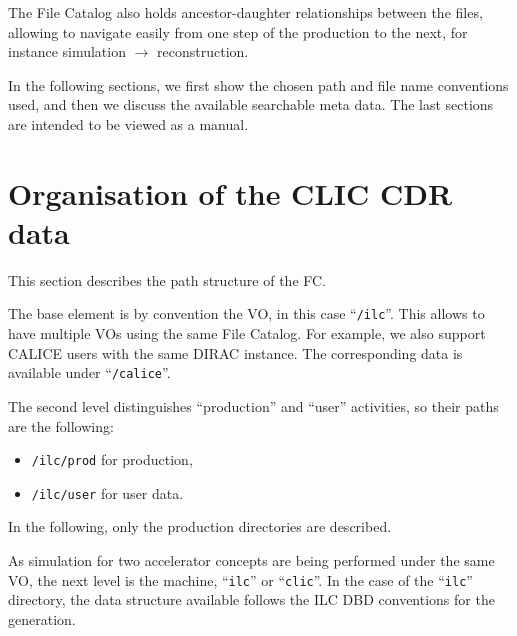 \documentclass[11pt,a4paper]{scrartcl}
\begin{document}
The File Catalog also holds ancestor-daughter relationships between the files,
allowing to navigate easily from one step of the production to the
next, for instance simulation $\to$ reconstruction.

In the following sections, we first show the chosen path and file name
conventions used, and then we discuss the available searchable meta data. The
last sections are intended to be viewed as a manual.

\section{Organisation of the CLIC CDR data}
This section describes the path structure of the FC. 

The base element is by convention the VO, in this case
``\lstinline[language=bash]|/ilc|''. This allows to have multiple VOs using the
same File Catalog. For example, we also support CALICE users with the same DIRAC
instance. The corresponding data is available under
``\lstinline[language=bash]|/calice|''.

The second level distinguishes ``production'' and ``user'' activities, so their
paths are the following:
\begin{itemize}
  \item \lstinline[language=bash]|/ilc/prod| for production,
  \item \lstinline[language=bash]|/ilc/user| for user data.
\end{itemize} 
In the following, only the production directories are described. 

As simulation for two accelerator concepts are being performed under the same
VO, the next level is the machine, ``\lstinline[language=bash]|ilc|'' or
``\lstinline[language=bash]|clic|''. In the case of the
``\lstinline[language=bash]|ilc|'' directory,  the data structure available
follows the ILC DBD conventions for the generation.
\end{document}
